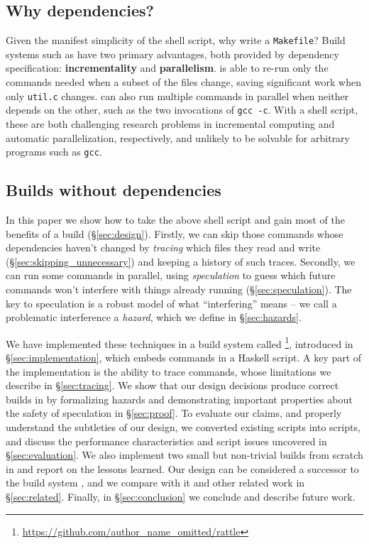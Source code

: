 \subsection{Why dependencies?}

Given the manifest simplicity of the shell script, why write a \texttt{Makefile}? Build systems such as \Make have two primary advantages, both provided by dependency specification: \textbf{incrementality} and \textbf{parallelism}. \Make is able to re-run only the commands needed when a subset of the files change, saving significant work when only \texttt{util.c} changes. \Make can also run multiple commands in parallel when neither depends on the other, such as the two invocations of \texttt{gcc -c}. With a shell script, these are both challenging research problems in incremental computing and automatic parallelization, respectively, and unlikely to be solvable for arbitrary programs such as \texttt{gcc}.

\subsection{Builds without dependencies}

In this paper we show how to take the above shell script and gain most of the benefits of a \Make build (\S\ref{sec:design}). Firstly, we can skip those commands whose dependencies haven't changed by \emph{tracing} which files they read and write (\S\ref{sec:skipping_unnecessary}) and keeping a history of such traces. Secondly, we can run some commands in parallel, using \emph{speculation} to guess which future commands won't interfere with things already running (\S\ref{sec:speculation}). The key to speculation is a robust model of what ``interfering'' means -- we call a problematic interference a \emph{hazard}, which we define in \S\ref{sec:hazards}.

We have implemented these techniques in a build system called \Rattle\footnote{\url{https://github.com/author_name_omitted/rattle}}, introduced in \S\ref{sec:implementation}, which embeds commands in a Haskell script. A key part of the implementation is the ability to trace commands, whose limitations we describe in \S\ref{sec:tracing}. We show that our design decisions produce correct builds in by formalizing hazards and demonstrating important properties about the safety of speculation in \S\ref{sec:proof}. To evaluate our claims, and properly understand the subtleties of our design, we converted existing \Make scripts into \Rattle scripts, and discuss the performance characteristics and \Make script issues uncovered in \S\ref{sec:evaluation}. We also implement two small but non-trivial builds from scratch in \Rattle and report on the lessons learned. Our design can be considered a successor to the \Memoize build system \cite{memoize}, and we compare \Rattle with it and other related work in \S\ref{sec:related}. Finally, in \S\ref{sec:conclusion} we conclude and describe future work.
